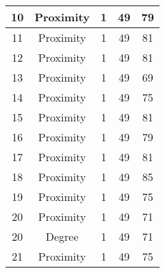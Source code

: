 \documentclass[results.tex]{subfiles}
\begin{document}
\begin{center}
\begin{tabular}{| c || c | c | c | c |}
            \hline
            10                      & Proximity                    & 1                      & 49                      & 79                   \\
            \hline
            11                      & Proximity                    & 1                      & 49                      & 81                   \\
            \hline
            12                      & Proximity                    & 1                      & 49                      & 81                   \\
            \hline
            13                      & Proximity                    & 1                      & 49                      & 69                   \\
            \hline
            14                      & Proximity                    & 1                      & 49                      & 75                   \\
            \hline
            15                      & Proximity                    & 1                      & 49                      & 81                   \\
            \hline
            16                      & Proximity                    & 1                      & 49                      & 79                   \\
            \hline
            17                      & Proximity                    & 1                      & 49                      & 81                   \\
            \hline
            18                      & Proximity                    & 1                      & 49                      & 85                   \\
            \hline
            19                      & Proximity                    & 1                      & 49                      & 75                   \\
            \hline
            20                      & Proximity                    & 1                      & 49                      & 71                   \\
            \hline
            20                      & Degree                       & 1                      & 49                      & 71                   \\
            \hline
            21                      & Proximity                    & 1                      & 49                      & 75                   \\

\end{tabular}
\end{center}
\end{document}
